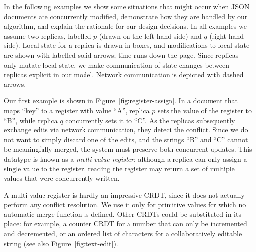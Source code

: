 \documentclass[10pt,journal,compsoc]{IEEEtran}
\begin{document}
In the following examples we show some situations that might occur when JSON documents are concurrently modified, demonstrate how they are handled by our algorithm, and explain the rationale for our design decisions. In all examples we assume two replicas, labelled $p$ (drawn on the left-hand side) and $q$ (right-hand side). Local state for a replica is drawn in boxes, and modifications to local state are shown with labelled solid arrows; time runs down the page. Since replicas only mutate local state, we make communication of state changes between replicas explicit in our model. Network communication is depicted with dashed arrows.

Our first example is shown in Figure~\ref{fig:register-assign}. In a document that maps ``key'' to a register with value ``A'', replica $p$ sets the value of the register to ``B'', while replica $q$ concurrently sets it to ``C''. As the replicas subsequently exchange edits via network communication, they detect the conflict. Since we do not want to simply discard one of the edits, and the strings ``B'' and ``C'' cannot be meaningfully merged, the system must preserve both concurrent updates. This datatype is known as a \emph{multi-value register}: although a replica can only assign a single value to the register, reading the register may return a set of multiple values that were concurrently written.

A multi-value register is hardly an impressive CRDT, since it does not actually perform any conflict resolution. We use it only for primitive values for which no automatic merge function is defined. Other CRDTs could be substituted in its place: for example, a counter CRDT for a number that can only be incremented and decremented, or an ordered list of characters for a collaboratively editable string (see also Figure~\ref{fig:text-edit}).
\end{document}
